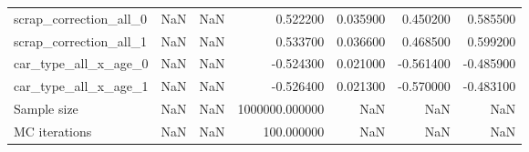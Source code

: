 \begin{tabular}{lrlrrrr}
scrap_correction_all_0 & NaN & NaN & 0.522200 & 0.035900 & 0.450200 & 0.585500 \\
scrap_correction_all_1 & NaN & NaN & 0.533700 & 0.036600 & 0.468500 & 0.599200 \\
car_type_all_x_age_0 & NaN & NaN & -0.524300 & 0.021000 & -0.561400 & -0.485900 \\
car_type_all_x_age_1 & NaN & NaN & -0.526400 & 0.021300 & -0.570000 & -0.483100 \\
Sample size & NaN & NaN & 1000000.000000 & NaN & NaN & NaN \\
MC iterations & NaN & NaN & 100.000000 & NaN & NaN & NaN \\
\bottomrule
\end{tabular}
